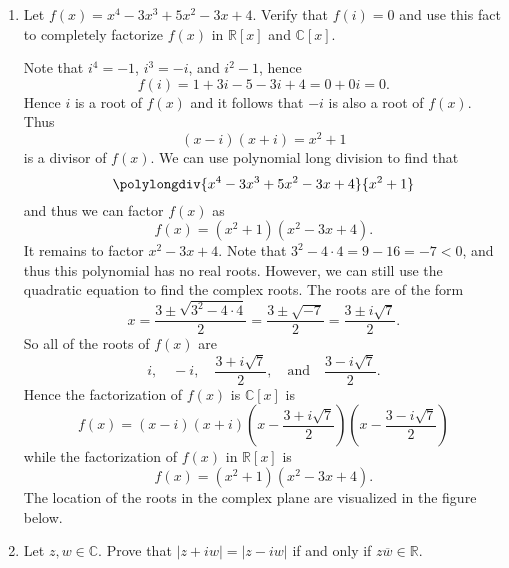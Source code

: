 \documentclass[11pt]{article}
\def\reals{\mathbb{R}}
\def\complex{\mathbb{C}}
\newcommand{\abs}[1]{\left|#1\right|}
\begin{document}
\begin{enumerate}
\begin{enumerate}
 \end{enumerate}
 \item Let $f(x) =x^4 - 3 x^3 + 5 x^2 - 3 x + 4$. Verify that $f(i)=0$ and use this fact to completely factorize $f(x)$ in $\reals[x]$ and $\complex[x]$.
 \begin{Solution}
  Note that $i^4=-1$, $i^3=-i$, and $i^2-1$, hence
  \[
   f(i) = 1 +3i -5 -3i +4 = 0 + 0i = 0.
  \]
Hence $i$ is a root of $f(x)$ and it follows that $-i$ is also a root of $f(x)$. Thus
\[
 (x-i)(x+i) = x^2+1
\]
is a divisor of $f(x)$. We can use polynomial long division to find that 
\[
    \polylongdiv{x^4 - 3 x^3 + 5 x^2 - 3 x + 4}{x^2+1}
  \]
and thus we can factor $f(x)$ as
\[
 f(x) = (x^2+1)(x^2-3x+4).
\]
It remains to factor $x^2-3x+4$. Note that $3^2-4\cdot 4 = 9-16 = -7 <0$, and thus this polynomial has no real roots. However, we can still use the quadratic equation to find the complex roots. The roots are of the form
\[
 x = \frac{3 \pm \sqrt{3^2-4\cdot 4}}{2} = \frac{3\pm\sqrt{-7}}{2} = \frac{3\pm i\sqrt{7}}{2}.
\]
So all of the roots of $f(x)$ are
 \[
  i,\quad -i, \quad \frac{3+ i\sqrt{7}}{2}, \quad\text{and}\quad \frac{3- i\sqrt{7}}{2}.
 \]
Hence the factorization of $f(x)$ is $\complex[x]$ is
\[
 f(x) = (x-i)(x+i) \left(x - \frac{3+ i\sqrt{7}}{2}\right)\left(x - \frac{3- i\sqrt{7}}{2}\right)
\]
while the factorization of $f(x)$ in $\reals[x]$ is
\[
 f(x) = (x^2+1)(x^2-3x+4).
\]
The location of the roots in the complex plane are visualized in the figure below.
\begin{center}
\end{center}

 \end{Solution}
 
 \item Let $z,w\in\complex$. Prove that $\abs{z+iw}=\abs{z-iw}$ if and only if $z\overline{w}\in\reals$.
 

\end{enumerate}
\end{document}
